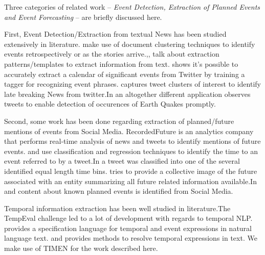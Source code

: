 Three categories of related work -- \emph{Event Detection, Extraction of Planned Events and  Event Forecasting} -- are briefly discussed here.

First, Event Detection/Extraction from textual News has been studied extensively in literature. \cite{Allan:2002:TDT} \cite{Yang:1998:SRO}\cite{Gabrilovich:2004:NPP} make use of document clustering techniques to identify events retrospectively or as the stories arrive.\cite{Chambers:2011:TIE},\cite{Banko07openinformation}, \cite{riloff2003learning} talk about extraction patterns/templates to extract information from text. \cite{Ritter:2012} shows it's possible to accurately extract a calendar of significant events from Twitter by training a tagger for recognizing event phrases.\cite{Sankaranarayanan:2009:TNT} captures tweet clusters of interest to identify late breaking News from twitter.In an altogether different application \cite{Sakaki:2010:EST} observes tweets to enable detection of occurences of Earth Quakes promptly.

Second, some work has been done regarding extraction of planned/future mentions of events from Social Media. RecordedFuture\cite{recordedFuture}  is an analytics company that performs real-time analysis of news and tweets to identify mentions of future events.\cite{tops2013predicting} and \cite{bosch2013estm} use classification and regression techniques to identify the time to an event referred to by a tweet.In \cite{tops2013predicting} a tweet was classified into one of the several identified equal length time bins. \cite{Jatowt:2011:ECE} tries to provide a collective image of the future associated with an entity summarizing all future related information available.In \cite{Becker:2012:ICP} and \cite{Becker_automaticidentification} content about known planned events is identified from Social Media. \iffalse \sathappanc{we do it on-line and focus mainly on planned protest and do it in multiple sources} \fi

Temporal information extraction has been well studied in literature.The TempEval challenge\cite{tempeval} led to a lot of development with regards to temporal NLP.\cite{timeml} provides a specification language for temporal and event expressions in natural language text.
\cite{LlorensDGS12} and \cite{tempex} provides methods to resolve temporal expressions in text. We make use of TIMEN \cite{LlorensDGS12} for the work described here.

